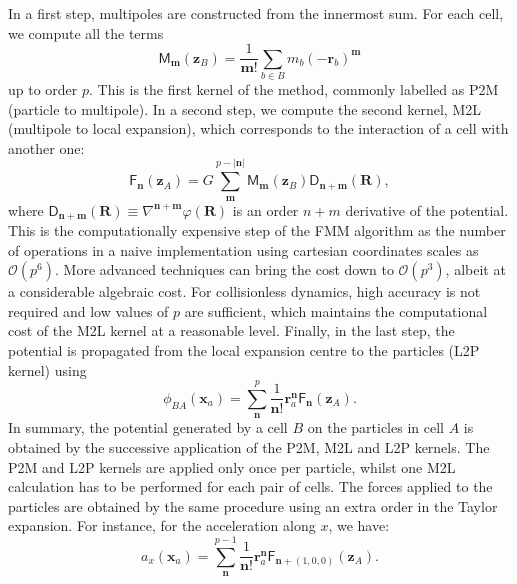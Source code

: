 In a first step, multipoles are constructed from the
innermost sum. For each cell, we compute all the terms
\begin{equation}
  \mathsf{M}_{\mathbf{m}}(\mathbf{z}_B) = \frac{1}{\mathbf{m}!}
  \sum_{b\in B} m_b\left(-\mathbf{r}_b\right)^\mathbf{m} \label{eq:fmm:P2M} 
\end{equation}
up to order $p$. This is the first kernel of the method, commonly
labelled as \textsc{P2M} (particle to multipole). In a second step, we
compute the second kernel, \textsc{M2L} (multipole to local
expansion), which corresponds to the interaction of a cell with
another one:
\begin{equation}
  \mathsf{F}_{\mathbf{n}}(\mathbf{z}_A) = G\sum_{\mathbf{m}}^{p -|\mathbf{n}|}
  \mathsf{M}_{\mathbf{m}}(\mathbf{z}_B)
  \mathsf{D}_{\mathbf{n}+\mathbf{m}}(\mathbf{R}), \label{eq:fmm:M2L} 
\end{equation}
where $\mathsf{D}_{\mathbf{n}+\mathbf{m}}(\mathbf{R}) \equiv
\nabla^{\mathbf{n}+\mathbf{m}} \varphi(\mathbf{R})$ is an order $n+m$
derivative of the potential. This is the computationally expensive
step of the FMM algorithm as the number of operations in a naive
implementation using cartesian coordinates scales as
$\mathcal{O}(p^6)$. More advanced techniques
\citep[e.g.][]{Dehnen2014} can bring the cost down to
$\mathcal{O}(p^3)$, albeit at a considerable algebraic cost. For
collisionless dynamics, high accuracy is not required and low values
of $p$ are sufficient, which maintains the computational cost of the
M2L kernel at a reasonable level.  
Finally, in the last step, the potential is propagated from the local
expansion centre to the particles (L2P kernel) using
\begin{equation}
  \phi_{BA}(\mathbf{x}_a) = \sum_{\mathbf{n}}^{p}
  \frac{1}{\mathbf{n}!} \mathbf{r}_a^{\mathbf{n}}
  \mathsf{F}_{\mathbf{n}}(\mathbf{z}_A). \label{eq:fmm:L2P} 
\end{equation}
In summary, the potential generated by a cell $B$ on the particles in
cell $A$ is obtained by the successive application of the P2M, M2L and
L2P kernels. The P2M and L2P kernels are applied only once per
particle, whilst one M2L calculation has to be performed for each pair
of cells. The forces applied to the particles are obtained by the same
procedure using an extra order in the Taylor expansion. For instance,
for the acceleration along $x$, we have:
\begin{equation}
  a_x(\mathbf{x}_a) = \sum_{\mathbf{n}}^{p-1}
  \frac{1}{\mathbf{n}!} \mathbf{r}_a^{\mathbf{n}}
  \mathsf{F}_{\mathbf{n}+\left(1,0,0\right)}(\mathbf{z}_A). \label{eq:fmm:L2P_force} 
\end{equation}

